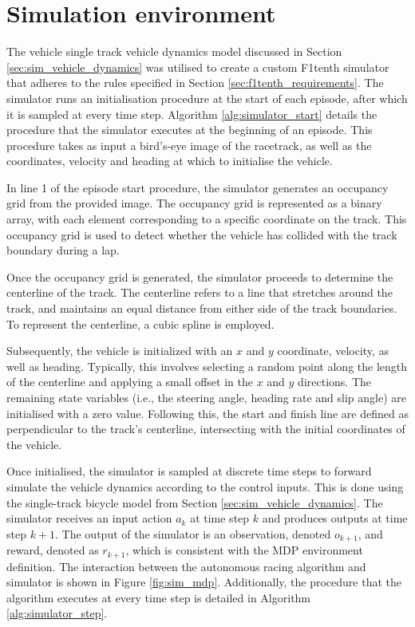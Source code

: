 \section{Simulation environment}\label{sec:simulation_environment}

The vehicle single track vehicle dynamics model discussed in Section \ref{sec:sim_vehicle_dynamics} was utilised to create a custom F1tenth simulator
that adheres to the rules specified in Section \ref{sec:f1tenth_requirements}. 
The simulator runs an initialisation procedure at the start of each episode, after which it is sampled at every time step.
Algorithm \ref{alg:simulator_start} details the procedure that the simulator executes at the beginning of an episode.
This procedure takes as input a bird's-eye image of the racetrack, as well as the coordinates, velocity and heading at which to initialise the vehicle. 

In line 1 of the episode start procedure, the simulator generates an occupancy grid from the provided image. 
The occupancy grid is represented as a binary array, with each element corresponding to a specific coordinate on the track. 
This occupancy grid is used to detect whether the vehicle has collided with the track boundary during a lap.



Once the occupancy grid is generated, the simulator proceeds to determine the centerline of the track. 
The centerline refers to a line that stretches around the track, and maintains an equal distance from either side of the track boundaries. 
To represent the centerline, a cubic spline \cite{Sakai2018} is employed.

Subsequently, the vehicle is initialized with an $x$ and $y$ coordinate, velocity, as well as heading.
Typically, this involves selecting a random point along the length of the centerline and applying a small offset in the $x$ and $y$ directions. 
The remaining state variables (i.e., the steering angle, heading rate and slip angle) are initialised with a zero value.
Following this, the start and finish line are defined as perpendicular to the track's centerline, intersecting with the initial coordinates of the vehicle.


Once initialised, the simulator is sampled at discrete time steps to forward simulate the vehicle dynamics according to the control inputs.
This is done using the single-track bicycle model from Section \ref{sec:sim_vehicle_dynamics}.
The simulator receives an input action $a_{k}$ at time step $k$ and produces outputs at time step $k+1$.
The output of the simulator is an observation, denoted $o_{k+1}$, and reward, denoted as $r_{k+1}$, which is consistent with the MDP environment definition.
The interaction between the autonomous racing algorithm and simulator is shown in Figure \ref{fig:sim_mdp}.
Additionally, the procedure that the algorithm executes at every time step is detailed in Algorithm \ref{alg:simulator_step}.

